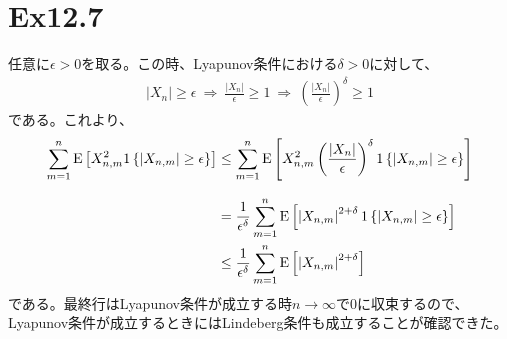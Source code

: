 \documentclass{article}
\begin{document}
\section{Ex12.7}
任意に$\epsilon > 0$を取る。この時、Lyapunov条件における$\delta > 0$に対して、
\begin{align*}
	\left| X_n \right| \geq \epsilon \ \Rightarrow\ \frac{\left| X_n \right|}{\epsilon} \geq 1\ \Rightarrow\ \left(  \frac{\left| X_n \right|}{\epsilon} \right)^{\delta} \geq 1
\end{align*}
である。これより、
\begin{align*}
	\sum_{m=1}^n {\rm E}\left[ X_{n,m}^2 1\left\{ \left| X_{n,m} \right| \geq \epsilon \right\} \right] &\leq \sum_{m=1}^n {\rm E}\left[ X_{n,m}^2  \left(  \frac{\left| X_n \right|}{\epsilon} \right)^{\delta} 1\left\{ \left| X_{n,m} \right| \geq \epsilon \right\} \right] \\[8pt]
	&=\frac{1}{\epsilon^{\delta}} \sum_{m=1}^n {\rm E}\left[ \left| X_{n,m} \right|^{2+\delta} 1\left\{ \left| X_{n,m} \right| \geq \epsilon \right\} \right]\\
	&\leq \frac{1}{\epsilon^{\delta}} \sum_{m=1}^n {\rm E}\left[ \left| X_{n,m} \right|^{2+\delta} \right]
\end{align*}
である。最終行はLyapunov条件が成立する時$n\to \infty$で$0$に収束するので、Lyapunov条件が成立するときにはLindeberg条件も成立することが確認できた。
\end{document}
